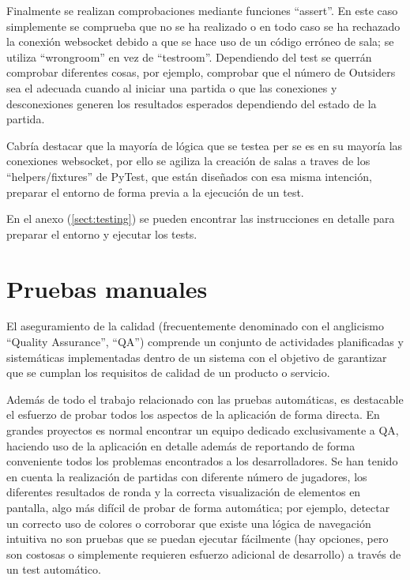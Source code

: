 Finalmente se realizan comprobaciones mediante funciones ``assert''. En este caso simplemente se comprueba que no se ha realizado
o en todo caso se ha rechazado la conexión websocket debido a que se hace uso de un código erróneo de sala; se utiliza ``wrong\textunderscore room''
en vez de ``test\textunderscore room''. Dependiendo del test se querrán comprobar diferentes cosas, por ejemplo, comprobar que el número de Outsiders sea
el adecuada cuando al iniciar una partida o que las conexiones y desconexiones generen los resultados esperados dependiendo del estado de la partida.

Cabría destacar que la mayoría de lógica que se testea per se es en su mayoría las conexiones websocket, por ello se agiliza la creación de salas
a traves de los ``helpers/fixtures'' de PyTest, que están diseñados con esa misma intención, preparar el entorno de forma previa a la ejecución de 
un test. 

En el anexo (\ref{sect:testing}) se pueden encontrar las instrucciones en detalle para preparar el entorno y ejecutar los tests.




\section{Pruebas manuales}

El aseguramiento de la calidad (frecuentemente denominado con el anglicismo ``Quality Assurance'', ``QA'') comprende un conjunto de actividades planificadas 
y sistemáticas implementadas dentro de un sistema con el objetivo de garantizar que se cumplan los requisitos de calidad 
de un producto o servicio.

Además de todo el trabajo relacionado con las pruebas automáticas, es destacable el esfuerzo de probar todos los aspectos de la aplicación
de forma directa. En grandes proyectos es normal encontrar un equipo dedicado exclusivamente a QA, haciendo uso de la aplicación en detalle
además de reportando de forma conveniente todos los problemas encontrados a los desarrolladores. Se han tenido en cuenta la realización de partidas
con diferente número de jugadores, los diferentes resultados de ronda y la correcta visualización de elementos en pantalla, algo más difícil de 
probar de forma automática; por ejemplo, detectar un correcto uso de colores o corroborar que existe una lógica de navegación intuitiva no son pruebas 
que se puedan ejecutar fácilmente (hay opciones, pero son costosas o simplemente requieren esfuerzo adicional de desarrollo) a través de un test automático.

